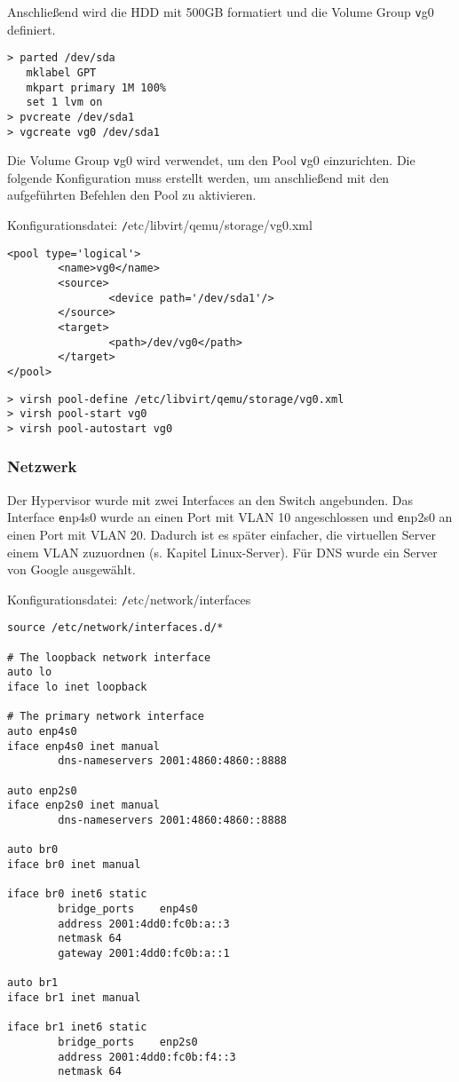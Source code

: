 Anschließend wird die HDD mit 500GB formatiert und die Volume Group {\texttt vg0} definiert.

\begin{lstlisting}[numbers=none]
> parted /dev/sda
   mklabel GPT
   mkpart primary 1M 100%
   set 1 lvm on
> pvcreate /dev/sda1
> vgcreate vg0 /dev/sda1
\end{lstlisting} 

Die Volume Group {\texttt vg0} wird verwendet, um den Pool {\texttt vg0} einzurichten. Die folgende Konfiguration muss erstellt werden, um anschließend mit den aufgeführten Befehlen den Pool zu aktivieren.       

Konfigurationsdatei: {\texttt /etc/libvirt/qemu/storage/vg0.xml}
\begin{lstlisting}
<pool type='logical'>
        <name>vg0</name>
        <source>
                <device path='/dev/sda1'/>
        </source>
        <target>
                <path>/dev/vg0</path>
        </target>
</pool>
\end{lstlisting}
\begin{lstlisting}[numbers=none]
> virsh pool-define /etc/libvirt/qemu/storage/vg0.xml
> virsh pool-start vg0
> virsh pool-autostart vg0
\end{lstlisting}

\subsubsection{Netzwerk}

Der Hypervisor wurde mit zwei Interfaces an den Switch angebunden. Das Interface {\texttt enp4s0} wurde an einen Port mit VLAN 10 angeschlossen und {\texttt enp2s0} an einen Port mit VLAN 20. Dadurch ist es später einfacher, die virtuellen Server einem VLAN zuzuordnen (s. Kapitel \ql Linux-Server\qr). Für DNS wurde ein Server von Google ausgewählt.

Konfigurationsdatei: {\texttt /etc/network/interfaces}
\begin{lstlisting}
source /etc/network/interfaces.d/*

# The loopback network interface
auto lo
iface lo inet loopback

# The primary network interface
auto enp4s0
iface enp4s0 inet manual
        dns-nameservers 2001:4860:4860::8888

auto enp2s0
iface enp2s0 inet manual
        dns-nameservers 2001:4860:4860::8888

auto br0
iface br0 inet manual

iface br0 inet6 static
        bridge_ports    enp4s0
        address 2001:4dd0:fc0b:a::3
        netmask 64
        gateway 2001:4dd0:fc0b:a::1

auto br1
iface br1 inet manual

iface br1 inet6 static
        bridge_ports    enp2s0
        address 2001:4dd0:fc0b:f4::3
        netmask 64
\end{lstlisting}

